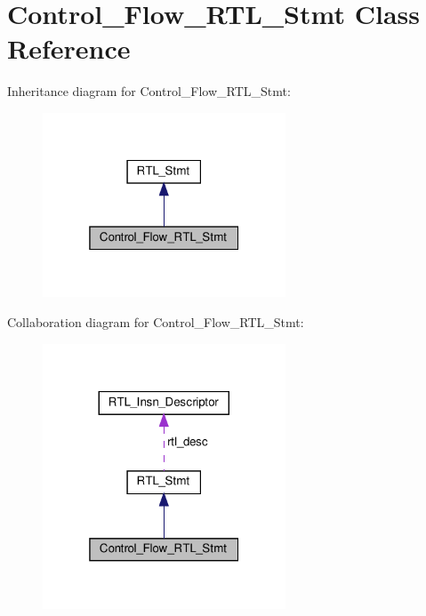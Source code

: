 \hypertarget{classControl__Flow__RTL__Stmt}{}\section{Control\+\_\+\+Flow\+\_\+\+R\+T\+L\+\_\+\+Stmt Class Reference}
\label{classControl__Flow__RTL__Stmt}


Inheritance diagram for Control\+\_\+\+Flow\+\_\+\+R\+T\+L\+\_\+\+Stmt\+:
\nopagebreak
\begin{figure}[H]
\begin{center}
\leavevmode
\includegraphics[width=205pt]{classControl__Flow__RTL__Stmt__inherit__graph}
\end{center}
\end{figure}


Collaboration diagram for Control\+\_\+\+Flow\+\_\+\+R\+T\+L\+\_\+\+Stmt\+:
\nopagebreak
\begin{figure}[H]
\begin{center}
\leavevmode
\includegraphics[width=205pt]{classControl__Flow__RTL__Stmt__coll__graph}
\end{center}
\end{figure}
